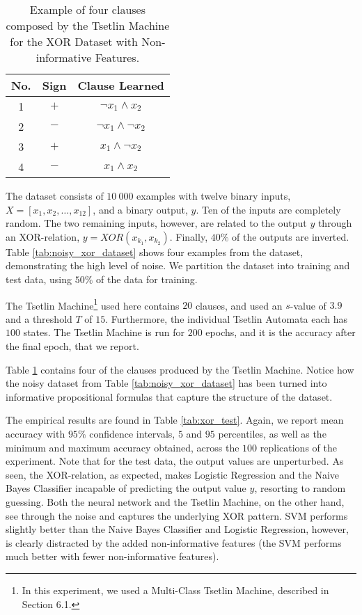 \documentclass[11pt,a4paper]{article}
\begin{document}
\begin{table}[!bh]
    \centering
    \begin{tabular}{c|c|c}
    {\bf No.}&{\bf Sign}&{\bf Clause Learned}\\
    \hline 
    \hline
    1&$+$&$\lnot x_1 \land x_2$\\
    2&$-$&$\lnot x_1 \land \lnot x_2$\\
    3&$+$&$x_1 \land \lnot x_2$\\
    4&$-$&$x_1 \land x_2$
    \end{tabular}
    \caption{Example of four clauses composed by the Tsetlin Machine for the XOR Dataset with Non-informative Features.}
    \label{tab:noisy_xor_dataset_clauses}
\end{table}

The dataset consists of $10~000$ examples with twelve binary inputs, $X = [x_1, x_2, \ldots, x_{12}]$, and a binary output, $y$. Ten of the inputs are completely random. The two remaining inputs, however, are related to the output $y$ through an XOR-relation, $y = XOR(x_{k_1}, x_{k_2})$. Finally, $40\%$ of the outputs are inverted. Table \ref{tab:noisy_xor_dataset} shows four examples from the dataset, demonstrating the high level of noise. We partition the dataset into training and test data, using $50\%$ of the data for training.

The Tsetlin Machine\footnote{In this experiment, we used a Multi-Class Tsetlin Machine, described in Section 6.1.} used here contains $20$ clauses, and used an $s$-value of $3.9$ and a threshold $T$ of $15$. Furthermore, the individual Tsetlin Automata each has $100$ states. The Tsetlin Machine is run for $200$ epochs, and it is the accuracy after the final epoch, that we report.

Table \ref{tab:noisy_xor_dataset_clauses} contains four of the clauses produced by the Tsetlin Machine. Notice how the noisy dataset from Table \ref{tab:noisy_xor_dataset} has been turned into informative propositional formulas that capture the structure of the dataset.

The empirical results are found in Table \ref{tab:xor_test}. Again, we report mean accuracy with $95\%$ confidence intervals, $5$ and $95$ percentiles, as well as the minimum and maximum accuracy obtained, across the $100$ replications of the experiment. Note that for the test data, the output values are unperturbed. As seen, the XOR-relation, as expected, makes Logistic Regression and the Naive Bayes Classifier incapable of predicting the output value $y$, resorting to random guessing. Both the neural network and the Tsetlin Machine, on the other hand, see through the noise and captures the underlying XOR pattern. SVM performs slightly better than the Naive Bayes Classifier and Logistic Regression, however, is clearly distracted by the added non-informative features (the SVM performs much better with fewer non-informative features).
\end{document}
